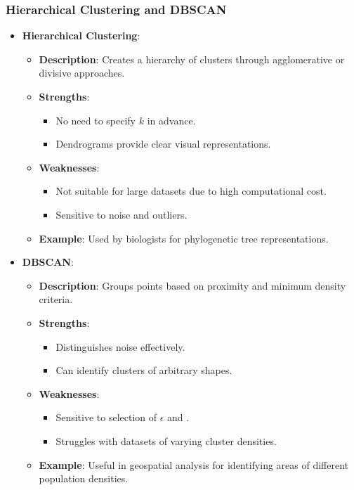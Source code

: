\documentclass[aspectratio=169]{beamer}
\begin{document}
\begin{frame}[fragile]
    \frametitle{Hierarchical Clustering and DBSCAN}
    \begin{itemize}
        \item \textbf{Hierarchical Clustering}:
            \begin{itemize}
                \item \textbf{Description}: Creates a hierarchy of clusters through agglomerative or divisive approaches.
                \item \textbf{Strengths}:
                    \begin{itemize}
                        \item No need to specify $k$ in advance.
                        \item Dendrograms provide clear visual representations.
                    \end{itemize}
                \item \textbf{Weaknesses}:
                    \begin{itemize}
                        \item Not suitable for large datasets due to high computational cost.
                        \item Sensitive to noise and outliers.
                    \end{itemize}
                \item \textbf{Example}: Used by biologists for phylogenetic tree representations.
            \end{itemize}
        
        \item \textbf{DBSCAN}:
            \begin{itemize}
                \item \textbf{Description}: Groups points based on proximity and minimum density criteria.
                \item \textbf{Strengths}:
                    \begin{itemize}
                        \item Distinguishes noise effectively.
                        \item Can identify clusters of arbitrary shapes.
                    \end{itemize}
                \item \textbf{Weaknesses}:
                    \begin{itemize}
                        \item Sensitive to selection of $\epsilon$ and .
                        \item Struggles with datasets of varying cluster densities.
                    \end{itemize}
                \item \textbf{Example}: Useful in geospatial analysis for identifying areas of different population densities.
            \end{itemize}
    \end{itemize}
\end{frame}
\end{document}
